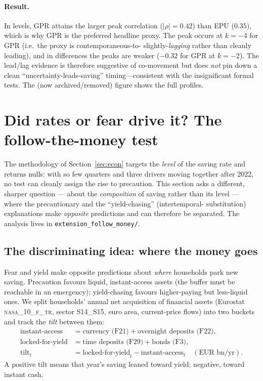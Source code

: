 \documentclass[11pt,a4paper]{article}
\newcommand{\code}[1]{\texttt{#1}}
\newcommand{\dataset}[1]{\textsc{#1}}
\begin{document}
\paragraph{Result.} In levels, GPR attains the larger peak correlation
($|\rho|=0.42$) than EPU ($0.35$), which is why GPR is the preferred headline
proxy. The peak occurs at $k=-4$ for GPR (i.e.\ the proxy is contemporaneous-to-
slightly-\emph{lagging} rather than cleanly leading), and in differences the
peaks are weaker ($-0.32$ for GPR at $k=-2$). The lead/lag evidence is therefore
suggestive of co-movement but does \emph{not} pin down a clean
``uncertainty-leads-saving'' timing---consistent with the insignificant formal
tests. The (now archived/removed) figure shows the full profiles.



\section{Did rates or fear drive it? The follow-the-money test}\label{sec:followmoney}

The methodology of Section~\ref{sec:econ} targets the \emph{level} of the saving
rate and returns nulls: with so few quarters and three drivers moving together
after 2022, no test can cleanly assign the rise to precaution. This section asks a
different, sharper question --- about the \emph{composition} of saving rather than
its level --- where the precautionary and the ``yield-chasing'' (intertemporal-%
substitution) explanations make \emph{opposite} predictions and can therefore be
separated. The analysis lives in \code{extension\_follow\_money/}.

\subsection{The discriminating idea: where the money goes}
Fear and yield make opposite predictions about \emph{where} households park new
saving. Precaution favours liquid, instant-access assets (the buffer must be
reachable in an emergency); yield-chasing favours higher-paying but less-liquid
ones. We split households' annual net acquisition of financial assets (Eurostat
\dataset{nasa\_10\_f\_tr}, sector S14\_S15, euro area, current-price flows) into
two buckets and track the \emph{tilt} between them:
\begin{align*}
\text{instant-access} &= \text{currency (F21)} + \text{overnight deposits (F22)},\\
\text{locked-for-yield} &= \text{time deposits (F29)} + \text{bonds (F3)},\\
\text{tilt}_t &= \text{locked-for-yield}_t - \text{instant-access}_t \quad(\text{EUR bn/yr}).
\end{align*}
A positive tilt means that year's saving leaned toward yield; negative, toward
instant cash.
\end{document}
